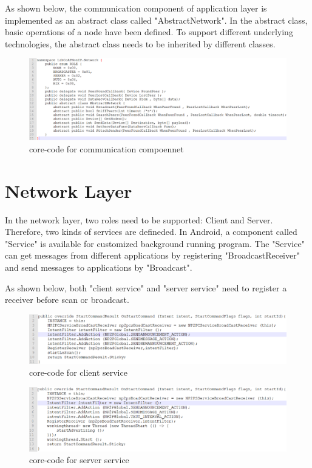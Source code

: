 \documentclass{Nan_Thesis}
\begin{document}
As shown below, the communication component of application layer is implemented as an abstract class called "AbstractNetwork". In the abstract class, basic operations of a node have been defined. To support different underlying technologies, the abstract class needs to be inherited by different classes.  

\begin{figure}[H]
  \centering 
      \includegraphics[scale=0.45]{pic/code2.png} 
  \caption{core-code for communication compoennet}
\end{figure}

\section{Network Layer}
In the network layer, two roles need to be supported: Client and Server. Therefore, two kinds of services are defineded. In Android, a component called "Service" is available for customized background running program. The "Service" can get messages from different applications by registering "BroadcastReceiver" and send messages to applications by "Broadcast".

As shown below, both "client service" and "server service" need to register a receiver before scan or broadcast. 

\begin{figure}[h]
  \centering 
      \includegraphics[scale=0.5]{pic/code3.png} 
  \caption{core-code for client service}
\end{figure}
\newpage
\begin{figure}[h]
  \centering 
      \includegraphics[scale=0.5]{pic/code4.png} 
  \caption{core-code for server service}
\end{figure}
\end{document}
